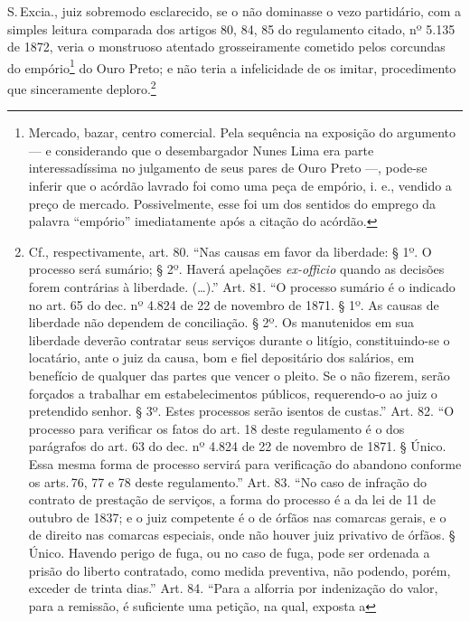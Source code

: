 S.\,Excia., juiz sobremodo esclarecido, se o não dominasse o vezo
partidário, com a simples leitura comparada dos artigos 80, 84, 85 do
regulamento citado, nº 5.135 de 1872, veria o monstruoso atentado
grosseiramente cometido pelos corcundas do empório\footnote{Mercado,
  bazar, centro comercial. Pela sequência na exposição do argumento --- e
  considerando que o desembargador Nunes Lima era parte interessadíssima no
  julgamento de seus pares de Ouro Preto ---, pode-se inferir que o
  acórdão lavrado foi como uma peça de empório, i. e., vendido a preço
  de mercado. Possivelmente, esse foi um dos sentidos do emprego da
  palavra ``empório'' imediatamente após a citação do acórdão.} do Ouro
Preto; e não teria a infelicidade de os imitar, procedimento que
sinceramente deploro.\footnote{Cf., respectivamente, art. 80. ``Nas
  causas em favor da liberdade: § 1º. O processo será sumário; § 2º.
  Haverá apelações \emph{ex-officio} quando as decisões forem contrárias
  à liberdade. (\ldots{}).'' Art. 81. ``O processo sumário é o indicado no art.
  65 do dec. nº 4.824 de 22 de novembro de 1871. § 1º. As causas de liberdade não
  dependem de conciliação. § 2º. Os manutenidos em sua liberdade deverão
  contratar seus serviços durante o litígio, constituindo-se o
  locatário, ante o juiz da causa, bom e fiel depositário dos salários,
  em benefício de qualquer das partes que vencer o pleito. Se o não
  fizerem, serão forçados a trabalhar em estabelecimentos públicos,
  requerendo-o ao juiz o pretendido senhor. § 3º. Estes processos serão
  isentos de custas.'' Art. 82. ``O processo para verificar os fatos do art.
  18 deste regulamento é o dos parágrafos do art. 63 do dec. nº 4.824 de
  22 de novembro de 1871. § Único. Essa mesma forma de processo servirá para
  verificação do abandono conforme os arts.\,76, 77 e 78 deste
  regulamento.'' Art. 83. ``No caso de infração do contrato de prestação de
  serviços, a forma do processo é a da lei de 11 de outubro de 1837; e o juiz
  competente é o de órfãos nas comarcas gerais, e o de direito nas
  comarcas especiais, onde não houver juiz privativo de órfãos. § Único.
  Havendo perigo de fuga, ou no caso de fuga, pode ser ordenada a prisão
  do liberto contratado, como medida preventiva, não podendo, porém,
  exceder de trinta dias.'' Art. 84. ``Para a alforria por indenização do
  valor, para a remissão, é suficiente uma petição, na qual, exposta a
}
